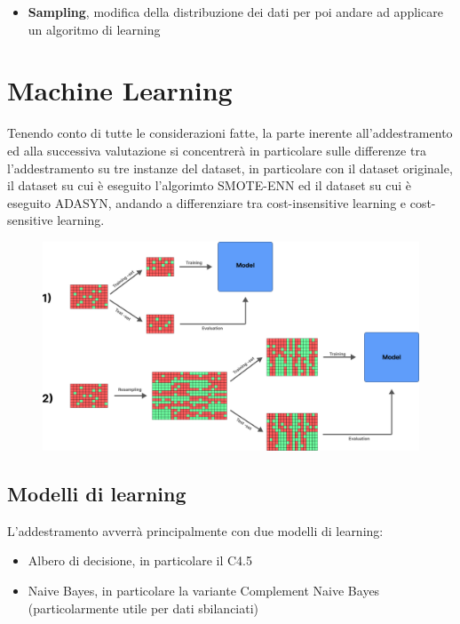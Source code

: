 \documentclass[italian,12pt,a4paper]{article}
\begin{document}
	\begin{itemize}
		\item \textbf{Sampling}, modifica della distribuzione dei dati per poi andare ad applicare un algoritmo di learning
	\end{itemize}
	
	\section{Machine Learning}
	Tenendo conto di tutte le considerazioni fatte, la parte inerente all'addestramento ed alla successiva valutazione si concentrerà in particolare sulle differenze tra l'addestramento su tre instanze del dataset, in particolare con il dataset originale, il dataset su cui è eseguito l'algorimto SMOTE-ENN ed il dataset su cui è eseguito ADASYN, andando a differenziare tra cost-insensitive learning e cost-sensitive learning.
	
	
		\begin{figure}[hb]
			\centering
			\includegraphics[width=15cm]{metodology_graph}
		\end{figure}
		
	\subsection{Modelli di learning}
	L'addestramento avverrà principalmente con due modelli di learning:
	
	\begin{itemize}
		\item Albero di decisione, in particolare il C4.5
		\item Naive Bayes, in particolare la variante Complement Naive Bayes (particolarmente utile per dati sbilanciati)
	\end{itemize}
	   
\end{document}
